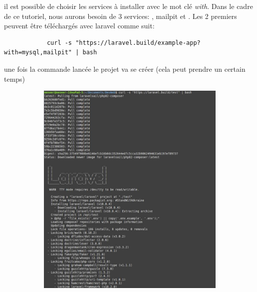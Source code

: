 \documentclass[internal]{nhitec_design}
\begin{document}
        il est possible de choisir les services à installer avec le mot clé \textit{with}. Dans le cadre de ce tutoriel, nous aurons besoin de 3 services: \mysql, mailpit et \phpmyadmin. Les 2 premiers peuvent être téléchargés avec laravel comme suit:

        \begin{lstlisting}
            curl -s "https://laravel.build/example-app?with=mysql,mailpit" | bash
        \end{lstlisting}

        une fois la commande lancée le projet va se créer (cela peut prendre un certain temps)

        \begin{figure}[h]
            \centering
            \begin{subfigure}{0.3\textwidth}
                \includegraphics[width=\textwidth]{Images_formation/CreateProject.pdf}
            \end{subfigure}
            \begin{subfigure}{0.3\textwidth}

\end{subfigure}
\end{figure}
\end{document}
